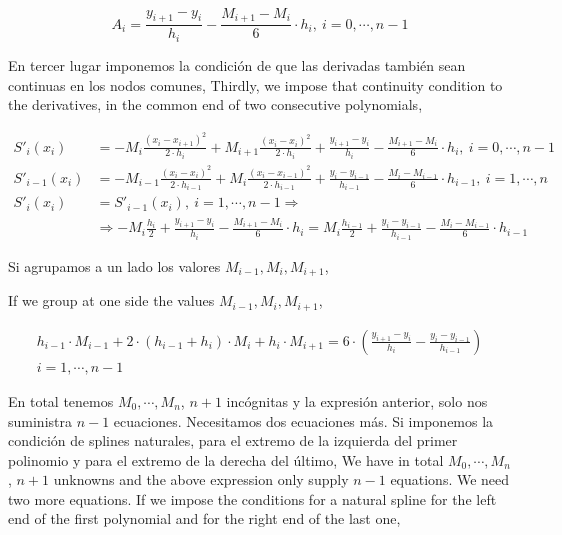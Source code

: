 \begin{equation*}
A_i=\frac{y_{i+1}-y_i}{h_i}-\frac{M_{i+1}-M_i}{6}\cdot h_i, \ i=0,\cdots, n-1
\end{equation*}
\begin{paracol}{2}
En tercer lugar imponemos la condición de que las derivadas también sean continuas en los nodos comunes,
\switchcolumn
Thirdly, we impose that continuity condition to the derivatives, in the common end of two consecutive polynomials,
\end{paracol}
\begin{align*}
S'_i(x_i)&=-M_i\frac{(x_i-x_{i+1})^2}{2\cdot h_i}+M_{i+1}\frac{(x_i-x_i)^2}{2\cdot h_i}+\frac{y_{i+1}-y_i}{h_i}-\frac{M_{i+1}-M_i}{6}\cdot h_i,\   i=0,\cdots, n-1\\
S'_{i-1}(x_i)&=-M_{i-1}\frac{(x_i-x_i)^2}{2\cdot h_{i-1}}+M_{i}\frac{(x_i-x_{i-1})^2}{2\cdot h_{i-1 }}+\frac{y_i-y_{i-1}}{h_{i-1}}-\frac{M_i-M_{i-1}}{6}\cdot h_{i-1},\   i=1,\cdots, n\\
S'_i(x_i)&=S'_{i-1}(x_i) ,\   i=1,\cdots, n-1 \Rightarrow\\
&\Rightarrow -M_i\frac{h_i}{2}+\frac{y_{i+1}-y_i}{h_i}-\frac{M_{i+1}-M_i}{6}\cdot h_i=M_{i}\frac{h_{i-1}}{2}+\frac{y_i-y_{i-1}}{h_{i-1}}-\frac{M_i-M_{i-1}}{6}\cdot h_{i-1}
\end{align*}
\begin{paracol}{2}
Si agrupamos a un lado los valores $M_{i-1}, M_i, M_{i+1}$,

\switchcolumn
If we group at one side the values $M_{i-1}, M_i, M_{i+1}$,
\end{paracol}
\begin{align*}
h_{i-1}\cdot M_{i-1}+2\cdot (h_{i-1}+h_i)\cdot M_i+h_i\cdot M_{i+1}=6\cdot \left(\frac{y_{i+1}-y_i}{h_i}-\frac{y_i-y_{i-1}}{h_{i-1}}\right)\\
i=1,\cdots ,n-1
\end{align*}
\begin{paracol}{2}
En total tenemos $M_0,\cdots, M_n$, $n+1$ incógnitas y la expresión anterior, solo nos suministra $n-1$ ecuaciones. Necesitamos dos ecuaciones más. Si imponemos la condición de splines naturales, para el extremo de la izquierda del primer polinomio y para el extremo de la derecha del último,
\switchcolumn
We have in total  $M_0,\cdots, M_n$, $n+1$ unknowns and the above expression only supply $n-1$ equations. We need two more equations. If we impose the conditions for a natural spline for the left end of the first polynomial and for the right end of the last one,  
\end{paracol}
